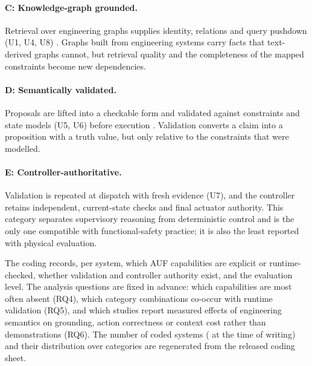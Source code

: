 \paragraph{C: Knowledge-graph grounded.} Retrieval over engineering graphs supplies identity,
relations and query pushdown (U1, U4, U8) \cite{edge2024graphrag,sarmah2024hybridrag,pan2024unifying,todkar2025semanticitot}.
Graphs built from engineering systems carry facts that text-derived graphs cannot, but
retrieval quality and the completeness of the mapped constraints become new dependencies.

\paragraph{D: Semantically validated.} Proposals are lifted into a checkable form and
validated against constraints and state models (U5, U6) before execution
\cite{knublauch2017shacl}. Validation converts a claim into a proposition with a truth
value, but only relative to the constraints that were modelled.

\paragraph{E: Controller-authoritative.} Validation is repeated at dispatch with fresh
evidence (U7), and the controller retains independent, current-state checks and final
actuator authority. This category separates supervisory reasoning from deterministic
control and is the only one compatible with functional-safety practice; it is also the
least reported with physical evaluation.



The coding records, per system, which AUF capabilities are explicit or runtime-checked,
whether validation and controller authority exist, and the evaluation level. The
analysis questions are fixed in advance: which capabilities are most often absent (RQ4),
which category combinations co-occur with runtime validation (RQ5), and which studies
report measured effects of engineering semantics on grounding, action correctness or
context cost rather than demonstrations (RQ6). The number of coded systems
(\AgentSystemsCoded{} at the time of writing) and their distribution over categories
are regenerated from the released coding sheet.
